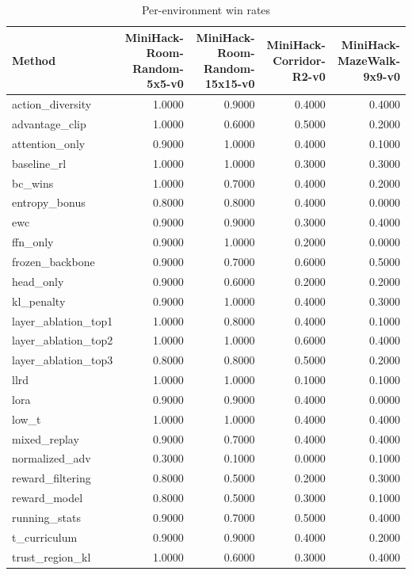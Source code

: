 \begin{table}[htbp]
\centering
\caption{Per-environment win rates}
\label{tab:per-env}
\begin{tabular}{lrrrr}
\toprule
\textbf{Method} & \textbf{MiniHack-Room-Random-5x5-v0} & \textbf{MiniHack-Room-Random-15x15-v0} & \textbf{MiniHack-Corridor-R2-v0} & \textbf{MiniHack-MazeWalk-9x9-v0} \\
\midrule
action\_diversity & 1.0000 & 0.9000 & 0.4000 & 0.4000 \\
advantage\_clip & 1.0000 & 0.6000 & 0.5000 & 0.2000 \\
attention\_only & 0.9000 & 1.0000 & 0.4000 & 0.1000 \\
baseline\_rl & 1.0000 & 1.0000 & 0.3000 & 0.3000 \\
bc\_wins & 1.0000 & 0.7000 & 0.4000 & 0.2000 \\
entropy\_bonus & 0.8000 & 0.8000 & 0.4000 & 0.0000 \\
ewc & 0.9000 & 0.9000 & 0.3000 & 0.4000 \\
ffn\_only & 0.9000 & 1.0000 & 0.2000 & 0.0000 \\
frozen\_backbone & 0.9000 & 0.7000 & 0.6000 & 0.5000 \\
head\_only & 0.9000 & 0.6000 & 0.2000 & 0.2000 \\
kl\_penalty & 0.9000 & 1.0000 & 0.4000 & 0.3000 \\
layer\_ablation\_top1 & 1.0000 & 0.8000 & 0.4000 & 0.1000 \\
layer\_ablation\_top2 & 1.0000 & 1.0000 & 0.6000 & 0.4000 \\
layer\_ablation\_top3 & 0.8000 & 0.8000 & 0.5000 & 0.2000 \\
llrd & 1.0000 & 1.0000 & 0.1000 & 0.1000 \\
lora & 0.9000 & 0.9000 & 0.4000 & 0.0000 \\
low\_t & 1.0000 & 1.0000 & 0.4000 & 0.4000 \\
mixed\_replay & 0.9000 & 0.7000 & 0.4000 & 0.4000 \\
normalized\_adv & 0.3000 & 0.1000 & 0.0000 & 0.1000 \\
reward\_filtering & 0.8000 & 0.5000 & 0.2000 & 0.3000 \\
reward\_model & 0.8000 & 0.5000 & 0.3000 & 0.1000 \\
running\_stats & 0.9000 & 0.7000 & 0.5000 & 0.4000 \\
t\_curriculum & 0.9000 & 0.9000 & 0.4000 & 0.2000 \\
trust\_region\_kl & 1.0000 & 0.6000 & 0.3000 & 0.4000 \\
\bottomrule
\end{tabular}
\end{table}